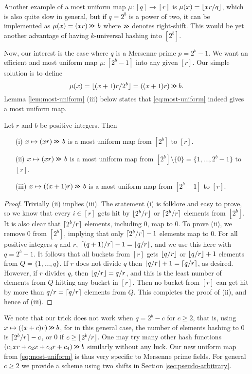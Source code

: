 Another example of a most uniform map $\mu:[q]\to[r]$ 
is $\mu(x)=\lfloor {xr/q} \rfloor$,
which is also quite slow in general, but if $q=2^b$ is a power of two,
it can be implemented as $\mu(x)=(xr)\mathbin{\texttt{>\!>}}\,b$ where 
$\mathbin{\texttt{>\!>}}$ denotes right-shift. This would be yet another advantage 
of having $k$-universal hashing into $[2^b]$.

Now, our interest is the case where $q$ is a Mersenne prime $p=2^b-1$. We want
an efficient and most uniform map $\mu:[2^b-1]$ into any given $[r]$.
Our simple solution is to define
\begin{equation}\label{eq:most-uniform}
   \mu(x)=\lfloor {(x+1)r/2^b} \rfloor=((x+1)r)\mathbin{\texttt{>\!>}} b.
\end{equation}
Lemma \ref{lem:most-uniform} (iii) below 
states that \eqref{eq:most-uniform} indeed
gives a most uniform map. 
\begin{lemma}\label{lem:most-uniform} Let $r$ and $b$ be positive integers.
   Then
   \begin{itemize}
      \item[(i)] $x\mapsto (xr)\mathbin{\texttt{>\!>}}\,b$ is a most
         uniform map from $[2^b]$ to $[r]$.
      \item[(ii)] $x\mapsto (xr)\mathbin{\texttt{>\!>}}\,b$ is a most
         uniform map from $[2^b]\setminus\{0\}=\{1,\ldots,2^b-1\}$ to $[r]$.
      \item[(iii)] $x\mapsto ((x+1)r)\mathbin{\texttt{>\!>}} \, b$ is a most
         uniform map from $[2^b-1]$ to $[r]$.
   \end{itemize}
\end{lemma}
\begin{proof}
   Trivially (ii) implies (iii). 
   The statement (i) is folklore and easy to prove, so we know that every
   $i\in[r]$ gets hit by $\lfloor {2^b/r} \rfloor$ or $\lceil {2^b/r}\rceil$ elements from
   $[2^b]$. It is also clear that $\lceil {2^b/r}\rceil$ elements, including $0$,
   map to $0$. To prove (ii), we remove $0$ from $[2^b]$, 
   implying that only
   $\lceil {2^b/r}\rceil-1$ elements map to $0$. For all positive integers $q$
   and $r$, $\lceil {(q+1)/r}\rceil-1=\lfloor {q/r} \rfloor$, and we use this here with 
   $q=2^b-1$. It follows that all buckets from $[r]$ gets $\lfloor {q/r} \rfloor$
   or $\lfloor {q/r} \rfloor+1$ elements from $Q=\{1,\ldots,q\}$. If $r$ does
   not divide $q$ then $\lfloor {q/r} \rfloor+1=\lceil {q/r}\rceil$, as desired. However,
   if $r$ divides $q$, then $\lfloor {q/r} \rfloor=q/r$, and this
   is the least number of elements from $Q$ hitting any bucket in $[r]$. Then 
   no bucket from $[r]$ can get hit by more than $q/r=\lceil {q/r}\rceil$ 
   elements from $Q$. This completes the proof of (ii), and hence of (iii).
\end{proof}
We note that our trick does not work when $q=2^b-c$ for $c\geq 2$, that is,
using $x\mapsto ((x+c)r)\mathbin{\texttt{>\!>}}  b$, for in this general case, 
the number of elements hashing to $0$ is $\lceil {2^b/r}\rceil-c$, or $0$ if
$c\geq \lfloor {2^b/r} \rfloor$.
One may try many other hash functions $(c_1 x r+ c_2 x+ c_3 r + c_4) \mathbin{\texttt{>\!>}} b$ similarly without any luck.
Our new uniform map from \eqref{eq:most-uniform} is thus very specific to Mersenne prime fields.
For general $c\ge 2$ we provide a scheme using two shifts in
Section \ref{sec:pseudo-arbitrary}.

